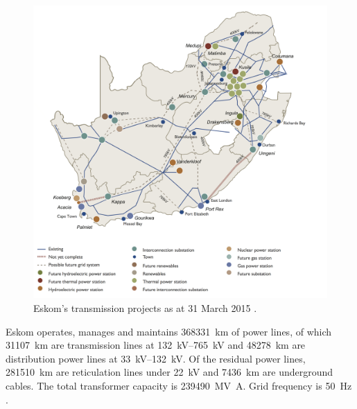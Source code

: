 \begin{figure}[htbp]
\centering
\includegraphics[width=1\linewidth]{FIG/transmissionprojekts}
\caption[Eskom’s transmission projects as at 31 March 2015.]{Eskom’s transmission projects as at 31 March 2015 \cite{Eskom2015a}.}\label{transmissionprojekts}
\end{figure}
Eskom operates, manages and maintains \SI{368331}{\kilo\meter} of power lines, of which \SI{31107}{\kilo\meter} are transmission lines at \SIrange{132}{765}{\kilo\volt} and \SI{48278}{\kilo\meter} are distribution power lines at \SIrange{33}{132}{\kilo\volt}. Of the residual power lines, \SI{281510}{\kilo\meter} are reticulation lines under \SI{22}{\kilo\volt} and \SI{7436}{\kilo\meter} are underground cables. The total transformer capacity is \SI{239490}{\mega\volt\ampere}. Grid frequency is \SI{50}{\hertz} \cite{Eskom2015b}.

